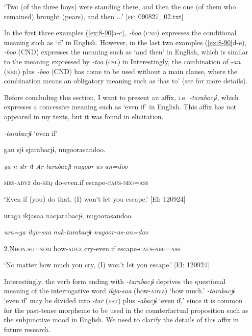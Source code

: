 \glt ‘Two (of the three boys) were standing there, and then the one (of them who remained) brought (pears), and then ...’ [\textsc{pf}: 090827\_02.txt]
\z

In the first three examples (\ref{ex:8-90}a-c), \textit{{}-boo} (\textsc{cnd}) expresses the conditional meaning such as ‘if’ in English. However, in the last two examples (\ref{ex:8-90}d-e), \textit{{}-boo} (CND) expresses the meaning such as ‘and then’ in English, which is similar to the meaning expressed by \textit{{}-too} (\textsc{csl}) in  Interestingly, the combination of \textit{{}-an} (\textsc{neg}) plus \textit{{}-boo} (CND) has come to be used without a main clause, where the combination means an obligatory meaning such as ‘has to’ (see  for more details).

  Before concluding this section, I want to present an affix, i.e. \textit{{}-tarabacjɨ}, which expresses a concessive meaning such as ‘even if’ in English. This affix has not appeared in my texts, but it was found in elicitation.

\ea\label{ex:8-91}
  \textit{{}-tarabacjɨ} ‘even if’

\ea {\TM}
\glll  gan  sjɨ  sjarabacjɨ,  nugoorasandoo.

      \textit{ga-n}  \textit{sɨr-tɨ}  \textit{sɨr-tarabacjɨ}  \textit{nugoor-as-an=doo}

      \textsc{mes}-\textsc{advz}  do-\textsc{seq}  do-even.if  escape-\textsc{caus}-\textsc{neg}=\textsc{ass}

\glt ‘Even if (you) do that, (I) won’t let you escape.’ [El: 120924]

\ex {\TM}
\glll  uraga  ikjasaa  nacjarabacjɨ,  nugoorasandoo.

      \textit{ura=ga}  \textit{ikja-saa}  \textit{nak-tarabacjɨ}  \textit{nugoor-as-an=doo}

      2.N\textsc{hon}.\textsc{sg}=\textsc{nom}  how-\textsc{advz}  cry-even.if  escape-\textsc{caus}-\textsc{neg}=\textsc{ass}

\glt ‘No matter how much you cry, (I) won’t let you escape.’ [El: 120924]

Interestingly, the verb form ending with \textit{{}-tarabacjɨ} deprives the questional meaning of the interrogative word \textit{ikja-saa} (how-\textsc{advz}) ‘how much.’ \textit{{}-tarabacjɨ} ‘even if’ may be divided into \textit{{}-tar} (\textsc{pst}) plus \textit{{}-abacjɨ} ‘even if,’ since it is common for the past-tense morpheme to be used in the counterfactual proposition such as the subjunctive mood in English. We need to clarify the details of this affix in future research.


